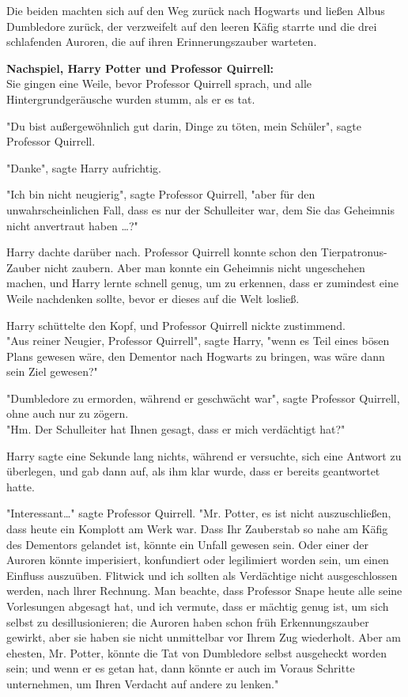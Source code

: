 {Die beiden machten sich auf den Weg zurück nach Hogwarts und ließen Albus Dumbledore zurück, der verzweifelt auf den leeren Käfig starrte und die drei schlafenden Auroren, die auf ihren Erinnerungszauber warteten.

\textbf{Nachspiel, Harry Potter und Professor Quirrell:}\\ Sie gingen eine Weile, bevor Professor Quirrell sprach, und alle Hintergrundgeräusche wurden stumm, als er es tat.

"Du bist außergewöhnlich gut darin, Dinge zu töten, mein Schüler", sagte Professor Quirrell.

"Danke", sagte Harry aufrichtig.

"Ich bin nicht neugierig", sagte Professor Quirrell, "aber für den unwahrscheinlichen Fall, dass es nur der Schulleiter war, dem Sie das Geheimnis nicht anvertraut haben …?"

Harry dachte darüber nach. Professor Quirrell konnte schon den Tierpatronus-Zauber nicht zaubern. Aber man konnte ein Geheimnis nicht ungeschehen machen, und Harry lernte schnell genug, um zu erkennen, dass er zumindest eine Weile nachdenken sollte, bevor er dieses auf die Welt losließ.

Harry schüttelte den Kopf, und Professor Quirrell nickte zustimmend.\\ "Aus reiner Neugier, Professor Quirrell", sagte Harry, "wenn es Teil eines bösen Plans gewesen wäre, den Dementor nach Hogwarts zu bringen, was wäre dann sein Ziel gewesen?"

"Dumbledore zu ermorden, während er geschwächt war", sagte Professor Quirrell, ohne auch nur zu zögern.\\ "Hm. Der Schulleiter hat Ihnen gesagt, dass er mich verdächtigt hat?"

Harry sagte eine Sekunde lang nichts, während er versuchte, sich eine Antwort zu überlegen, und gab dann auf, als ihm klar wurde, dass er bereits geantwortet hatte.

"Interessant…" sagte Professor Quirrell. "Mr. Potter, es ist nicht auszuschließen, dass heute ein Komplott am Werk war. Dass Ihr Zauberstab so nahe am Käfig des Dementors gelandet ist, könnte ein Unfall gewesen sein. Oder einer der Auroren könnte imperisiert, konfundiert oder legilimiert worden sein, um einen Einfluss auszuüben. Flitwick und ich sollten als Verdächtige nicht ausgeschlossen werden, nach lhrer Rechnung. Man beachte, dass Professor Snape heute alle seine Vorlesungen abgesagt hat, und ich vermute, dass er mächtig genug ist, um sich selbst zu desillusionieren; die Auroren haben schon früh Erkennungszauber gewirkt, aber sie haben sie nicht unmittelbar vor Ihrem Zug wiederholt. Aber am ehesten, Mr. Potter, könnte die Tat von Dumbledore selbst ausgeheckt worden sein; und wenn er es getan hat, dann könnte er auch im Voraus Schritte unternehmen, um Ihren Verdacht auf andere zu lenken."

}
